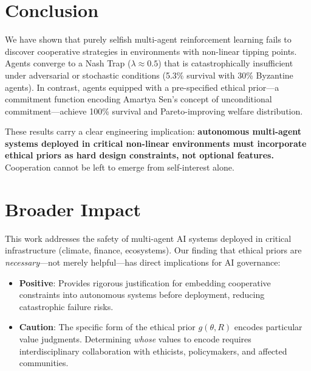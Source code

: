 \documentclass{article}
\begin{document}
\section{Conclusion}

We have shown that purely selfish multi-agent reinforcement learning fails to discover cooperative strategies in environments with non-linear tipping points.
Agents converge to a Nash Trap ($\lambda \approx 0.5$) that is catastrophically insufficient under adversarial or stochastic conditions (5.3\% survival with 30\% Byzantine agents).
In contrast, agents equipped with a pre-specified ethical prior---a commitment function encoding Amartya Sen's concept of unconditional commitment---achieve 100\% survival and Pareto-improving welfare distribution.

These results carry a clear engineering implication: \textbf{autonomous multi-agent systems deployed in critical non-linear environments must incorporate ethical priors as hard design constraints, not optional features.}
Cooperation cannot be left to emerge from self-interest alone.

\section*{Broader Impact}

This work addresses the safety of multi-agent AI systems deployed in critical infrastructure (climate, finance, ecosystems).
Our finding that ethical priors are \emph{necessary}---not merely helpful---has direct implications for AI governance:
\begin{itemize}
    \item \textbf{Positive}: Provides rigorous justification for embedding cooperative constraints into autonomous systems before deployment, reducing catastrophic failure risks.
    \item \textbf{Caution}: The specific form of the ethical prior $g(\theta, R)$ encodes particular value judgments. Determining \emph{whose} values to encode requires interdisciplinary collaboration with ethicists, policymakers, and affected communities.
\end{itemize}



\end{document}
